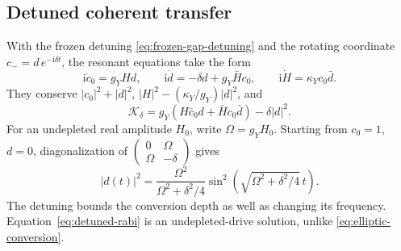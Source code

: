 \documentclass[11pt,a4paper,oneside]{book}
\theoremstyle{plain}
\theoremstyle{definition}
\theoremstyle{remark}
\newcommand{\ii}{\mathrm i}
\newcommand{\src}[2]{\cite{#1}}
\begin{document}
\subsection{Detuned coherent transfer}
With the frozen detuning \eqref{eq:frozen-gap-detuning} and the rotating
coordinate $c_-=d\,e^{-\ii\delta t}$, the resonant equations take the form
\begin{equation}
 \ii\dot c_0=g_YHd,\qquad
 \ii\dot d=-\delta d+g_Y\bar Hc_0,\qquad
 \ii\dot H=\kappa_Yc_0\bar d.
 \label{eq:detuned-triad}
\end{equation}
They conserve $|c_0|^2+|d|^2$,
$|H|^2-(\kappa_Y/g_Y)|d|^2$, and
\[
 \mathcal K_\delta
 =g_Y(H\bar c_0d+\bar Hc_0\bar d)-\delta|d|^2.
\]
For an undepleted real amplitude $H_0$, write $\Omega=g_YH_0$.
Starting from $c_0=1$, $d=0$, diagonalization of
$\left(\begin{smallmatrix}0&\Omega\\\Omega&-\delta\end{smallmatrix}\right)$
gives
\begin{equation}
 |d(t)|^2=\frac{\Omega^2}{\Omega^2+\delta^2/4}
             \sin^2\!\left(\sqrt{\Omega^2+\delta^2/4}\,t\right).
 \label{eq:detuned-rabi}
\end{equation}
The detuning bounds the conversion depth as well as changing its frequency.
Equation~\eqref{eq:detuned-rabi} is an undepleted-drive solution, unlike
\eqref{eq:elliptic-conversion}.  \src{R20}{thm:v20v27-classical}
\end{document}
